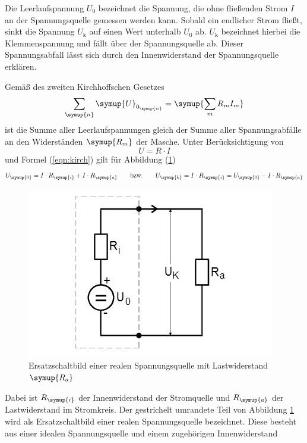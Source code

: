 Die Leerlaufspannung $U_{\text{0}}$ bezeichnet die Spannung, die ohne
fließenden Strom $I$ an der Spannungsquelle gemessen werden kann.
Sobald ein endlicher Strom fließt, sinkt die Spannung $U_{\text{k}}$ auf einen
Wert unterhalb $U_{\text{0}}$ ab. $U_{\text{k}}$ bezeichnet hierbei die
Klemmenspannung und fällt über der Spannungsquelle ab.
Dieser Spannungsabfall lässt sich durch den Innenwiderstand der Spannungsquelle
erklären.

Gemäß des zweiten Kirchhoffschen Gesetzes
\begin{equation}
  \sum_\symup{n} \symup{U}_{0_\symup{n}} = \symup{\sum_m R_m I_m}
  \label{eqn:kirch}
\end{equation}
ist die Summe aller Leerlaufspannungen gleich der Summe aller
Spannungsabfälle an den Widerständen $\symup{R_m}$ der Masche.
Unter Berücksichtigung von
\begin{equation}
  U=R\cdot I
\end{equation}
und Formel (\ref{eqn:kirch}) gilt für Abbildung (\ref{fig:real})
\begin{equation}
  U_\symup{0}=I \cdot R_\symup{i} + I \cdot R_\symup{a}
  \qquad
  \text{bzw.}
  \qquad
  U_\symup{k}=I \cdot R_\symup{i} = U_\symup{0} - I \cdot R_\symup{a}
  \label{eqn:U0k}
\end{equation}
\begin{figure}[H]
   \centering
  \includegraphics{bilder/real}
  \caption{Ersatzschaltbild einer realen Spannungsquelle mit Lastwiderstand
  $\symup{R_a}$ \cite{301}}
  \label{fig:real}
\end{figure}
Dabei ist $R_\symup{i}$ der Innenwiderstand der Stromquelle und $R_\symup{a}$
der Lastwiderstand im Stromkreis.
Der gestrichelt umrandete Teil von Abbildung \ref{fig:real} wird als
Ersatzschaltbild einer realen Spannungsquelle bezeichnet. Diese besteht aus
einer idealen Spannungsquelle und einem zugehörigen Innenwiderstand
